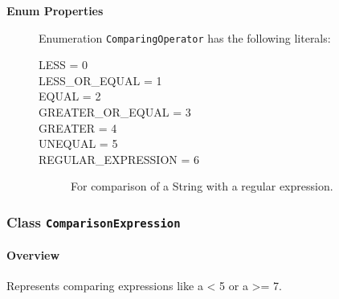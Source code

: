 \begin{description}

	\item[\textbf{Enum Properties}] Enumeration \texttt{ComparingOperator} has the following literals:

	\begin{description}
		
		\item[LESS = 0]
		\hspace{\fill}
		\nopagebreak

		\item[LESS\_OR\_EQUAL = 1]
		\hspace{\fill}
		\nopagebreak

		\item[EQUAL = 2]
		\hspace{\fill}
		\nopagebreak

		\item[GREATER\_OR\_EQUAL = 3]
		\hspace{\fill}
		\nopagebreak

		\item[GREATER = 4]
		\hspace{\fill}
		\nopagebreak

		\item[UNEQUAL = 5]
		\hspace{\fill}
		\nopagebreak

		\item[REGULAR\_EXPRESSION = 6]
		\hspace{\fill}
		\nopagebreak
		
For comparison of a String with a regular expression.	
 
	\end{description}

\end{description}



\subsubsection{\Large{Class \bfseries \texttt{ComparisonExpression}\normalfont}}
\label{cls:core::expressions::common::ComparisonExpression} 
\paragraph{Overview}

	
			
Represents comparing expressions like a < 5 or a >= 7.	
		
